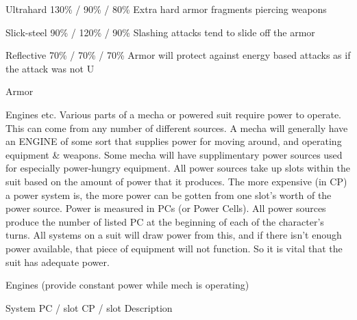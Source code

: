 \documentclass[twoside]{book}
\begin{document}
                      
                       Ultrahard   
                       130\% / 90\% / 80\%   
                         Extra hard armor fragments piercing
                         weapons 
                      
                      
                       Slick-steel   
                       90\% / 120\% / 90\%   
                         Slashing attacks tend to slide off the
                         armor 
                      
                      
                       Reflective   
                       70\% / 70\% / 70\%   
                          Armor will protect against energy based
                         attacks as if the attack was not U 
                      
                    
                  Armor  
                  
                
                
                Engines etc.  
                    Various parts of a mecha or powered suit
                   require power to operate. This can come from any
                   number of different sources. A mecha will generally
                   have an ENGINE of some sort that supplies power for
                   moving around, and operating equipment \& weapons.
                   Some mecha will have supplimentary power sources used
                   for especially power-hungry equipment. All power
                   sources take up slots within the suit based on the
                   amount of power that it produces. The more expensive
                   (in CP) a power system is, the more power can be
                   gotten from one slot’s worth of the power
                   source. Power is measured in PCs (or Power Cells). All
                   power sources produce the number of listed PC at the
                   beginning of each of the character’s turns. All
                   systems on a suit will draw power from this, and if
                   there isn’t enough power available, that piece
                   of equipment will not function. So it is vital that
                   the suit has adequate power. 
                  
                    Engines (provide constant power while mech is
                     operating)
                    
                      
                       System   
                       PC / slot   
                       CP / slot   
                       Description   
                      
\end{document}
